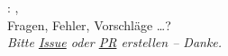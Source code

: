\thispagestyle{empty}

\hfill

\vfill

\noindent\myName: \textit{\myTitle}, \ifdef{\mySubtitle}{\mySubtitle,}{} %
\textcopyright\ \myTime \\

\noindent Fragen, Fehler, Vorschläge \ldots?\\
\textit{Bitte \href{https://github.com/derOtto/seminar/issues}{Issue} oder \href{https://github.com/derOtto/seminar/pulls}{PR} erstellen – Danke.}

%
%
%
%
%
